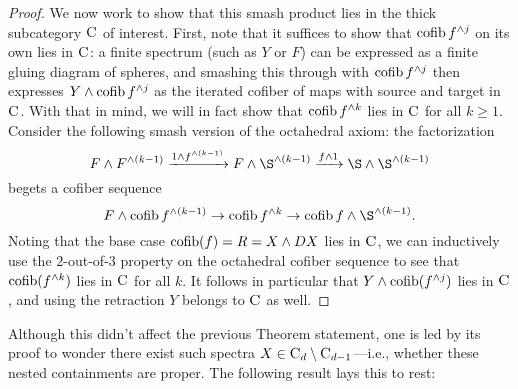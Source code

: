 \begin{proof}
We now work to show that this smash product lies in the thick subcategory \(\normalfont\textsc{C}\) of interest.  First, note that it suffices to show that \(\operatorname{cofib} f^{\wedge j}\) on its own lies in \(\normalfont\textsc{C}\): a finite spectrum (such as \(Y\) or \(F\)) can be expressed as a finite gluing diagram of spheres, and smashing this through with \(\operatorname{cofib} f^{\wedge j}\) then expresses \(Y \wedge \operatorname{cofib} f^{\wedge j}\) as the iterated cofiber of maps with source and target in \(\normalfont\textsc{C}\).  With that in mind, we will in fact show that \(\operatorname{cofib} f^{\wedge k}\) lies in \(\normalfont\textsc{C}\) for all \(k \ge 1\).  Consider the following smash version of the octahedral axiom: the factorization \[F \sm F^{\sm (k-1)} \xrightarrow{1 \sm f^{\sm (k-1)}} F \sm \S^{\sm (k-1)} \xrightarrow{f \sm 1} \S \sm \S^{\sm (k-1)}\] begets a cofiber sequence \[F \sm \cofib f^{\sm (k-1)} \to \cofib f^{\sm k} \to \cofib f \sm \S^{\sm (k-1)}.\]  Noting that the base case \(\operatorname{cofib}(f) = R = X \wedge DX\) lies in \(\normalfont\textsc{C}\), we can inductively use the \(2\)-out-of-\(3\) property on the octahedral cofiber sequence to see that \(\operatorname{cofib}(f^{\wedge k})\) lies in \(\normalfont\textsc{C}\) for all \(k\).  It follows in particular that \(Y \wedge \operatorname{cofib}(f^{\wedge j})\) lies in \(\normalfont\textsc{C}\), and using the retraction \(Y\) belongs to \(\normalfont\textsc{C}\) as well.
\end{proof}

Although this didn't affect the previous Theorem statement, one is led by its proof to wonder there exist such spectra $X \in \normalfont\textsc{C}_d \setminus \normalfont\textsc{C}_{d-1}$---i.e., whether these nested containments are proper.  The following result lays this to rest:

